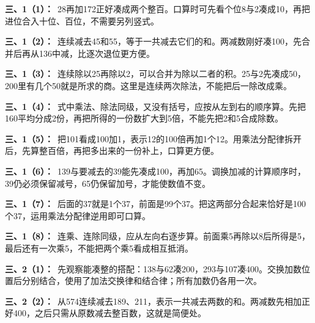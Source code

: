 \documentclass[multi=snippet,border=0pt]{standalone}
\newenvironment{snippet}[3]{\begin{minipage}{#1bp}\color{answerred}\fontsize{#2}{#3}\selectfont\raggedright}{\end{minipage}}
\begin{document}
\begin{snippet}{505}{11.5}{14}\textbf{三、1（1）：}\ 28再加172正好凑成两个整百。口算时可先看个位8与2凑成10，再把进位合入十位、百位，不需要另列竖式。\end{snippet}
\begin{snippet}{505}{11.5}{14}\textbf{三、1（2）：}\ 连续减去45和55，等于一共减去它们的和。两减数刚好凑100，先合并后再从136中减，比逐次退位更方便。\end{snippet}
\begin{snippet}{505}{11.5}{14}\textbf{三、1（3）：}\ 连续除以25再除以2，可以合并为除以二者的积。25与2先凑成50，200里有几个50就是所求的商。这里是连续两次除法，不能把后一除改成乘。\end{snippet}
\begin{snippet}{505}{11.5}{14}\textbf{三、1（4）：}\ 式中乘法、除法同级，又没有括号，应按从左到右的顺序算。先把160平均分成2份，再把所得的一份数扩大到5倍，不能先把2和5合成除数。\end{snippet}
\begin{snippet}{505}{11.5}{14}\textbf{三、1（5）：}\ 把101看成100加1，表示12的100倍再加1个12。用乘法分配律拆开后，先算整百倍，再把多出来的一份补上，口算更方便。\end{snippet}
\begin{snippet}{505}{11.5}{14}\textbf{三、1（6）：}\ 139与要减去的39能先凑成100，再加65。调换加减的计算顺序时，39仍必须保留减号，65仍保留加号，才能使数值不变。\end{snippet}
\begin{snippet}{505}{11.5}{14}\textbf{三、1（7）：}\ 后面的37就是1个37，前面是99个37。把这两部分合起来恰好是100个37，运用乘法分配律逆用即可口算。\end{snippet}
\begin{snippet}{505}{11.5}{14}\textbf{三、1（8）：}\ 连乘、连除同级，应从左向右逐步算。前面乘5再除以8后所得是5，最后还有一次乘5，不能把两个乘5看成相互抵消。\end{snippet}
\begin{snippet}{505}{11.5}{14}\textbf{三、2（1）：}\ 先观察能凑整的搭配：138与62凑200，293与107凑400。交换加数位置后分别结合，使用了加法交换律和结合律；所有加数仍各用一次。\end{snippet}
\begin{snippet}{505}{11.5}{14}\textbf{三、2（2）：}\ 从574连续减去189、211，表示一共减去两数的和。两减数先相加正好400，之后只需从原数减去整百数，这就是简便处。\end{snippet}
\end{document}
